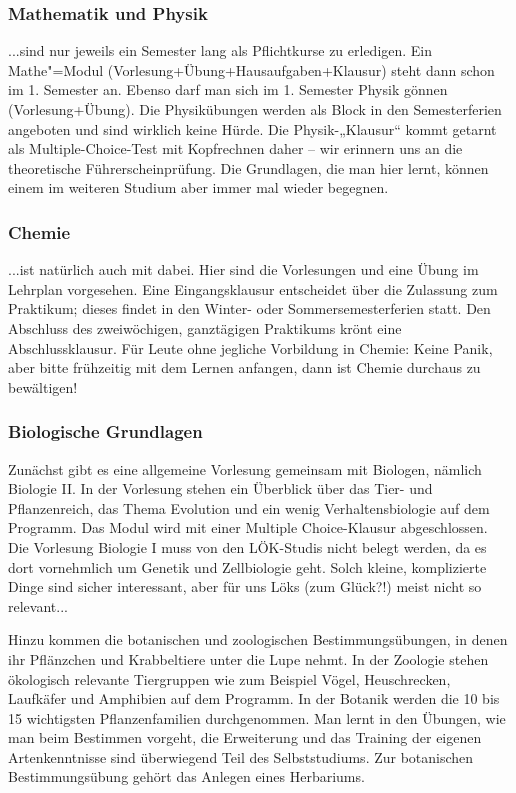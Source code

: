 \subsubsection*{Mathematik und Physik}
...sind nur jeweils ein Semester lang als Pﬂichtkurse zu erledigen. Ein Mathe"=Modul (Vorlesung+Übung+Hausaufgaben+Klausur) steht dann schon im 1. Semester an. Ebenso darf man sich im 1. Semester Physik gönnen (Vorlesung+Übung). Die Physikübungen werden als Block in den Semesterferien angeboten und sind wirklich keine Hürde. Die Physik-„Klausur“ kommt getarnt als Multiple-Choice-Test mit Kopfrechnen daher – wir erinnern uns an die theoretische Führerscheinprüfung. Die Grundlagen, die man hier lernt, können einem im weiteren Studium aber immer mal wieder begegnen.

\subsubsection*{Chemie}
...ist natürlich auch mit dabei. Hier sind die Vorlesungen und eine Übung im Lehrplan vorgesehen. Eine Eingangsklausur entscheidet über die Zulassung zum Praktikum; dieses ﬁndet in den Winter- oder Sommersemesterferien statt. Den Abschluss des zweiwöchigen, ganztägigen Praktikums krönt eine Abschlussklausur. Für Leute ohne jegliche Vorbildung in Chemie: Keine Panik, aber bitte frühzeitig mit dem Lernen anfangen, dann ist Chemie durchaus zu bewältigen! 

\subsubsection{Biologische Grundlagen}
Zunächst gibt es eine allgemeine Vorlesung gemeinsam mit Biologen, nämlich Biologie II. In der Vorlesung stehen ein Überblick über das Tier- und Pflanzenreich, das Thema Evolution und ein wenig Verhaltensbiologie auf dem Programm. Das Modul wird mit einer Multiple Choice-Klausur abgeschlossen. Die Vorlesung Biologie I muss von den LÖK-Studis nicht belegt werden, da es dort vornehmlich um Genetik und Zellbiologie geht. Solch kleine, komplizierte Dinge sind sicher interessant, aber für uns Löks (zum Glück?!) meist nicht so relevant...

Hinzu kommen die botanischen und zoologischen Bestimmungsübungen, in denen ihr Pflänzchen und Krabbeltiere unter die Lupe nehmt. In der Zoologie stehen ökologisch relevante Tiergruppen wie zum Beispiel Vögel, Heuschrecken, Laufkäfer und Amphibien auf dem Programm. In der Botanik werden die 10 bis 15 wichtigsten Pflanzenfamilien durchgenommen. Man lernt in den Übungen, wie man beim Bestimmen vorgeht, die Erweiterung und das Training der eigenen Artenkenntnisse sind überwiegend Teil des Selbststudiums. Zur botanischen Bestimmungsübung gehört das Anlegen eines Herbariums.


